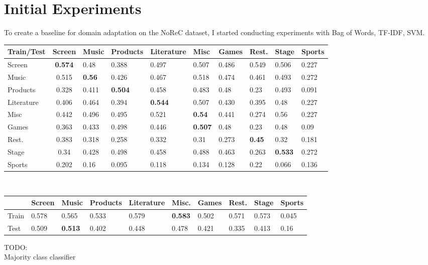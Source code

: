 \section{Initial Experiments}
To create a baseline for domain adaptation on the NoReC dataset, I started conducting experiments with Bag of Words, TF-IDF, SVM.\\
\begin{table}[]
	\begin{tabular}{|l|c|l|l|l|l|l|l|l|l|}
		\hline
		Train/Test & \multicolumn{1}{l|}{Screen}& Music     	 & Products       & Literature 		& Misc 	  		& Games 		& Rest.         & Stage  		& Sports        \\ \hline
		Screen     & \textbf{0.574}             & 0.48           & 0.388          & 0.497	   		& 0.507    		& 0.486			& 0.549         & 0.506  		& 0.227			\\ \hline
		Music	   & 0.515                      & \textbf{0.56}  & 0.426          & 0.467 	   		& 0.518    		& 0.474 		& 0.461         & 0.493  		& 0.272 	   \\ \hline
		Products   & 0.328                      & 0.411			 & \textbf{0.504} & 0.458 	   		& 0.483    		& 0.48	 		& 0.23          & 0.493  		& 0.091        \\ \hline
		Literature & 0.406                      & 0.464          & 0.394          & \textbf{0.544}	& 0.507    		& 0.430 		& 0.395 		& 0.48  		& 0.227		\\ \hline
		Misc  	   & 0.442                      & 0.496 		 & 0.495          & 0.521 	   		& \textbf{0.54}	& 0.441 		& 0.274         & 0.56   		& 0.227   	\\ \hline
		Games      & 0.363                      & 0.433          & 0.498          & 0.446 	   		& \textbf{0.507} & 0.48			& 0.23          & 0.48   		& 0.09 		  \\ \hline
		Rest.      & 0.383 						& 0.318          & 0.258          & 0.332 	   		& 0.31    		& 0.273 		& \textbf{0.45}& 0.32	  		& 0.181        \\ \hline
		Stage      & 0.34 						& 0.428          & 0.498          & 0.458 	   		& 0.488    		& 0.463 		& 0.263			& \textbf{0.533}& 0.272  	\\ \hline
		Sports     & 0.202 						& 0.16           & 0.095          & 0.118 	   		& 0.134    		& 0.128 		& 0.22          & 0.066  		& 0.136   \\ \hline
	\end{tabular}
\end{table}
\\
\begin{table}[]
	\begin{tabular}{|l|l|l|l|l|l|l|l|l|l|}
		\hline
			  &	Screen & Music 			& Products  & Literature & Misc.		  & Games & Rest. & Stage & Sports      \\ \hline
		Train & 0.578  & 0.565 			& 0.533 	& 0.579 	 & \textbf{0.583} & 0.502 & 0.571 & 0.573 & 0.045 		\\ \hline
		Test  & 0.509  & \textbf{0.513} & 0.402     & 0.448      & 0.478          & 0.421 & 0.335 & 0.413 & 0.16		\\ \hline
	\end{tabular}
\end{table}
TODO:\\
Majority class classifier
